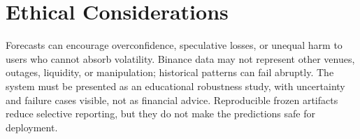 \documentclass[final]{article}
\begin{document}
\section{Ethical Considerations}
Forecasts can encourage overconfidence, speculative losses, or unequal harm to users who cannot
absorb volatility. Binance data may not represent other venues, outages, liquidity, or manipulation;
historical patterns can fail abruptly. The system must be presented as an educational robustness
study, with uncertainty and failure cases visible, not as financial advice. Reproducible frozen
artifacts reduce selective reporting, but they do not make the predictions safe for deployment.

\clearpage


\end{document}
